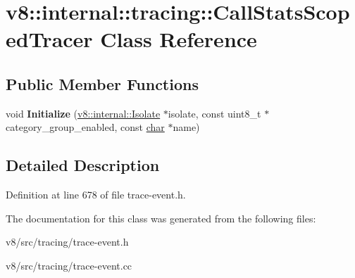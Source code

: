 \hypertarget{classv8_1_1internal_1_1tracing_1_1CallStatsScopedTracer}{}\section{v8\+:\+:internal\+:\+:tracing\+:\+:Call\+Stats\+Scoped\+Tracer Class Reference}
\label{classv8_1_1internal_1_1tracing_1_1CallStatsScopedTracer}
\subsection*{Public Member Functions}
\begin{DoxyCompactItemize}
\item 
\mbox{\label{classv8_1_1internal_1_1tracing_1_1CallStatsScopedTracer_a3d5362d97dac82d8897a681a55ab4fe5}} 
void {\bfseries Initialize} (\mbox{\hyperlink{classv8_1_1internal_1_1Isolate}{v8\+::internal\+::\+Isolate}} $\ast$isolate, const uint8\+\_\+t $\ast$category\+\_\+group\+\_\+enabled, const \mbox{\hyperlink{classchar}{char}} $\ast$name)
\end{DoxyCompactItemize}


\subsection{Detailed Description}


Definition at line 678 of file trace-\/event.\+h.



The documentation for this class was generated from the following files\+:\begin{DoxyCompactItemize}
\item 
v8/src/tracing/trace-\/event.\+h\item 
v8/src/tracing/trace-\/event.\+cc\end{DoxyCompactItemize}
